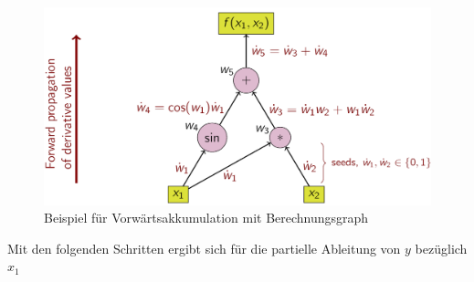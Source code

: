 \documentclass[
]{book}
\theoremstyle{definition}
\theoremstyle{definition}
\theoremstyle{definition}
\theoremstyle{definition}
\theoremstyle{remark}
\begin{document}
\begin{figure}
\includegraphics[width=1\linewidth]{bilder/ForwardAccumulationAutomaticDifferentiation} \caption{Beispiel für Vorwärtsakkumulation mit Berechnungsgraph}\label{fig:fig-10-ad-fwd}
\end{figure}

Mit den folgenden Schritten ergibt sich für die partielle
Ableitung von \(y\) bezüglich \(x_1\)
\end{document}

